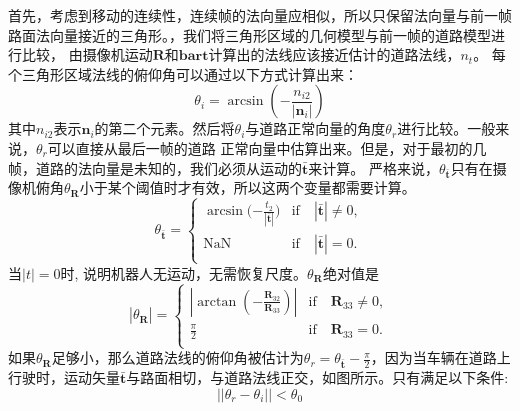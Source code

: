 首先，考虑到移动的连续性，连续帧的法向量应相似，所以只保留法向量与前一帧路面法向量接近的三角形。，我们将三角形区域的几何模型与前一帧的道路模型进行比较，
由摄像机运动$\mathbf{R}$和$\mathbf{bar{t}}$计算出的法线应该接近估计的道路法线，$n_t$。
每个三角形区域法线的俯仰角可以通过以下方式计算出来：
\begin{equation}
    \theta_i =\arcsin{(-\frac{n_{i2}}{|\mathbf{n}_{i}|})}
    \label{eq:pitch_n_triangle}
\end{equation}
其中$n_{i2}$表示$\mathbf{n}_i$的第二个元素。然后将$\theta_{i}$与道路正常向量的角度$\theta_{r}$进行比较。一般来说，$\theta_{r}$可以直接从最后一帧的道路
正常向量中估算出来。但是，对于最初的几帧，道路的法向量是未知的，我们必须从运动的$\mathbf{\bar{t}}$来计算。
严格来说，$\theta_\mathbf{\bar{t}}$只有在摄像机俯角$\theta_{\mathbf{R}}$小于某个阈值时才有效，所以这两个变量都需要计算。
\begin{equation}
    \theta_\mathbf{\bar{t}} =
    \begin{cases}
        \arcsin{(-\frac{t_{2}}{|\mathbf{\bar{t}}|}}) &\text{if}\quad |\mathbf{\bar{t}}|\neq 0,\\
        \text{NaN} &\text{if}\quad |\mathbf{\bar{t}}| = 0.\\
    \end{cases}
    \label{eq:pitch_t}
 \end{equation}
当$|t|=0$时, 说明机器人无运动，无需恢复尺度。$\theta_{\mathbf{R}}$绝对值是
\begin{equation}
    \label{eq:pitch_r}
     |\theta_{\mathbf{R}}| = 
    \begin{cases}
         |\arctan{(-\frac{\mathbf{R}_{32}}{\mathbf{R}_{33}})}| & \text{if}\quad\mathbf{R}_{33}\neq 0,\\
        \frac{\pi}{2}&\text{if}\quad\mathbf{R}_{33} = 0.\\
    \end{cases}
 \end{equation}
如果$\theta_{\mathbf{R}}$足够小，那么道路法线的俯仰角被估计为$\theta_r=\theta_\mathbf{\bar{t}}-\frac{\pi}{2}$，因为当车辆在道路上行驶时，运动矢量$\mathbf{\bar{t}}$与路面相切，与道路法线正交，如图所示。只有满足以下条件:
\begin{equation}
    || \theta_r- \theta_i || < \theta_0 %
\end{equation}
